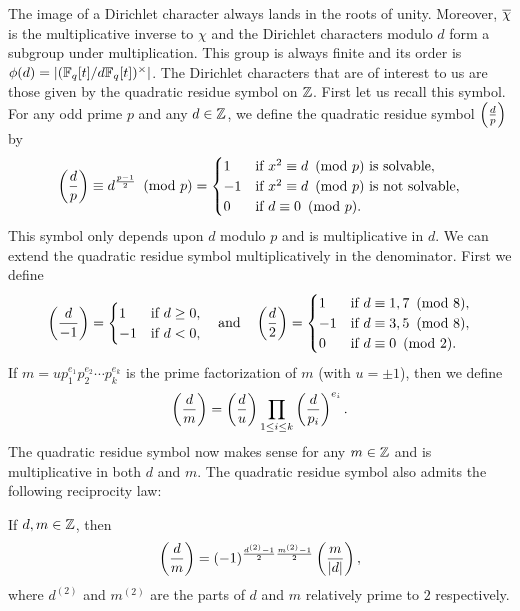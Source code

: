 \documentclass[12pt,reqno,oneside]{amsart}
\begin{document}
    The image of a Dirichlet character always lands in the roots of unity. Moreover, $\overline{\chi}$ is the multiplicative inverse to $\chi$ and the Dirichlet characters modulo $d$ form a subgroup under multiplication. This group is always finite and its order is $\phi(d) = |(\mathbb{F}_{q}[t]/d\mathbb{F}_{q}[t])^{\times}|$. The Dirichlet characters that are of interest to us are those given by the quadratic residue symbol on $\mathbb{Z}$. First let us recall this symbol. For any odd prime $p$ and any $d \in \mathbb{Z}$, we define the quadratic residue symbol $\textstyle{\left(\frac{d}{p}\right)}$ by
    \[
        \left(\frac{d}{p}\right) \equiv d^{\frac{p-1}{2}} \ \left(\text{mod }p\right) = \begin{cases} 1 & \text{if $x^{2} \equiv d \ \left(\text{mod }p\right)$ is solvable}, \\ -1 & \text{if $x^{2} \equiv d \ \left(\text{mod }p\right)$ is not solvable}, \\ 0 & \text{if $d \equiv 0 \ \left(\text{mod }p\right)$}. \end{cases}
    \]
    This symbol only depends upon $d$ modulo $p$ and is multiplicative in $d$. We can extend the quadratic residue symbol multiplicatively in the denominator. First we define
    \[
        \left(\frac{d}{-1}\right) = \begin{cases} 1 & \text{if $d \ge 0$}, \\ -1 & \text{if $d < 0$}, \end{cases} \quad \text{and} \quad \left(\frac{d}{2}\right) = \begin{cases} 1 & \text{if $d \equiv 1,7 \ \left(\text{mod }8\right)$}, \\ -1 & \text{if $d \equiv 3,5 \ \left(\text{mod }8\right)$}, \\ 0 & \text{if $d \equiv 0 \ \left(\text{mod }2\right)$}. \end{cases}
    \]
    If $m = up_{1}^{e_{1}}p_{2}^{e_{2}} \cdots p_{k}^{e_{k}}$ is the prime factorization of $m$ (with $u = \pm1$), then we define
    \[
        \left(\frac{d}{m}\right) = \left(\frac{d}{u}\right)\prod_{1 \le i \le k}\left(\frac{d}{p_{i}}\right)^{e_{i}}.
    \]
    The quadratic residue symbol now makes sense for any $m \in \mathbb{Z}$ and is multiplicative in both $d$ and $m$. The quadratic residue symbol also admits the following reciprocity law:

    \begin{theorem}
        If $d,m \in \mathbb{Z}$, then
        \[
            \left(\frac{d}{m}\right) = (-1)^{\frac{d^{(2)}-1}{2}\frac{m^{(2)}-1}{2}}\left(\frac{m}{|d|}\right),
        \]
        where $d^{(2)}$ and $m^{(2)}$ are the parts of $d$ and $m$ relatively prime to $2$ respectively.
    \end{theorem}
\end{document}
